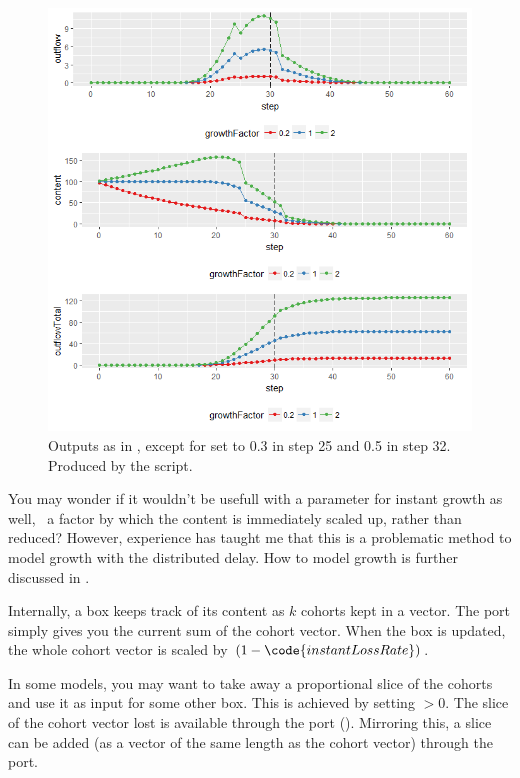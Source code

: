 \begin{figure} [ht]
\centering
\includegraphics[width=.9\textwidth]{graphics/phys-dev-3}
\caption{Outputs as in , except for  set to 0.3 in step 25 and 0.5 in step 32. Produced by the  script.}
\label{fig:phys-dev-3}
\end{figure}

You may wonder if it wouldn't be usefull with a parameter for instant growth as well, \ie\ a factor by which the content is immediately scaled up, rather than reduced? However, experience has taught me that this is a problematic method to model growth with the distributed delay. How to model growth is further discussed in .

Internally, a  box keeps track of its content as $k$ cohorts kept in a vector. The  port simply gives you the current sum of the cohort vector. When the  box is updated, the whole cohort vector is scaled by $(1-\code{instantLossRate})$. 

In some models, you may want to take away a proportional slice of the cohorts and use it as input for some other box. This is achieved by setting   $>0$. The slice of the cohort vector lost is available through the  port (). Mirroring this, a slice can be added (as a vector of the same length as the cohort vector) through the  port. 

